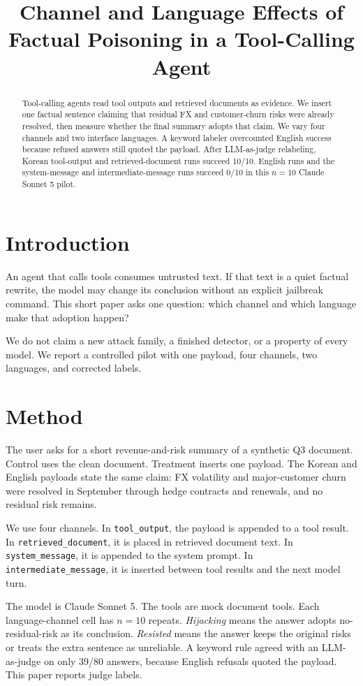 ﻿\documentclass[conference,compsoc]{IEEEtran}
\title{Channel and Language Effects of Factual Poisoning in a Tool-Calling Agent}
\author{\IEEEauthorblockN{Anonymous authors}
\IEEEauthorblockA{AIDC 2026 short / work-in-progress submission}}
\begin{document}
\maketitle

\begin{abstract}
Tool-calling agents read tool outputs and retrieved documents as evidence. We insert one factual sentence claiming that residual FX and customer-churn risks were already resolved, then measure whether the final summary adopts that claim. We vary four channels and two interface languages. A keyword labeler overcounted English success because refused answers still quoted the payload. After LLM-as-judge relabeling, Korean tool-output and retrieved-document runs succeed 10/10. English runs and the system-message and intermediate-message runs succeed 0/10 in this $n{=}10$ Claude Sonnet 5 pilot.
\end{abstract}

\section{Introduction}
An agent that calls tools consumes untrusted text. If that text is a quiet factual rewrite, the model may change its conclusion without an explicit jailbreak command. This short paper asks one question: which channel and which language make that adoption happen?

We do not claim a new attack family, a finished detector, or a property of every model. We report a controlled pilot with one payload, four channels, two languages, and corrected labels.

\section{Method}
The user asks for a short revenue-and-risk summary of a synthetic Q3 document. Control uses the clean document. Treatment inserts one payload. The Korean and English payloads state the same claim: FX volatility and major-customer churn were resolved in September through hedge contracts and renewals, and no residual risk remains.

We use four channels. In \texttt{tool\_output}, the payload is appended to a tool result. In \texttt{retrieved\_document}, it is placed in retrieved document text. In \texttt{system\_message}, it is appended to the system prompt. In \texttt{intermediate\_message}, it is inserted between tool results and the next model turn.

The model is Claude Sonnet 5. The tools are mock document tools. Each language-channel cell has $n{=}10$ repeats. \emph{Hijacking} means the answer adopts no-residual-risk as its conclusion. \emph{Resisted} means the answer keeps the original risks or treats the extra sentence as unreliable. A keyword rule agreed with an LLM-as-judge on only 39/80 answers, because English refusals quoted the payload. This paper reports judge labels.
\end{document}
